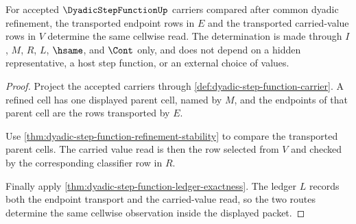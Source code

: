 \begin{theorem}
\label{thm:dyadic-step-function-endpoint-value-transport-determinacy}
For accepted $\DyadicStepFunctionUp$ carriers compared after common dyadic refinement, the transported endpoint rows in $E$ and the transported carried-value rows in $V$ determine the same cellwise read. The determination is made through $I$, $M$, $R$, $L$, $\hsame$, and $\Cont$ only, and does not depend on a hidden representative, a host step function, or an external choice of values.
\end{theorem}
\begin{proof}
Project the accepted carriers through \autoref{def:dyadic-step-function-carrier}. A refined cell has one displayed parent cell, named by $M$, and the endpoints of that parent cell are the rows transported by $E$.

Use \autoref{thm:dyadic-step-function-refinement-stability} to compare the transported parent cells. The carried value read is then the row selected from $V$ and checked by the corresponding classifier row in $R$.

Finally apply \autoref{thm:dyadic-step-function-ledger-exactness}. The ledger $L$ records both the endpoint transport and the carried-value read, so the two routes determine the same cellwise observation inside the displayed packet.
\end{proof}

